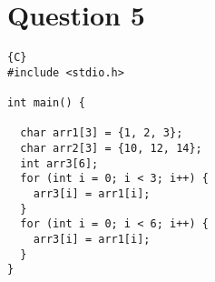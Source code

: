 \documentclass{report}
\begin{document}
\section{Question 5}

\begin{lstlisting}{C}
#include <stdio.h>

int main() {

  char arr1[3] = {1, 2, 3};
  char arr2[3] = {10, 12, 14};
  int arr3[6];
  for (int i = 0; i < 3; i++) {
    arr3[i] = arr1[i];
  }
  for (int i = 0; i < 6; i++) {
    arr3[i] = arr1[i];
  }
}
\end{lstlisting}
\end{document}
